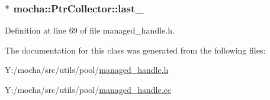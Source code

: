 \hypertarget{classmocha_1_1_ptr_collector_aace5d19f242e09ab9f1cf71a97f91fa2}{
\subsubsection[{last\_\-}]{$\ast$ {\bf mocha::PtrCollector::last\_\-}}}
\label{classmocha_1_1_ptr_collector_aace5d19f242e09ab9f1cf71a97f91fa2}


Definition at line 69 of file managed\_\-handle.h.



The documentation for this class was generated from the following files:\begin{DoxyCompactItemize}
\item 
Y:/mocha/src/utils/pool/\hyperlink{managed__handle_8h}{managed\_\-handle.h}\item 
Y:/mocha/src/utils/pool/\hyperlink{managed__handle_8cc}{managed\_\-handle.cc}\end{DoxyCompactItemize}
